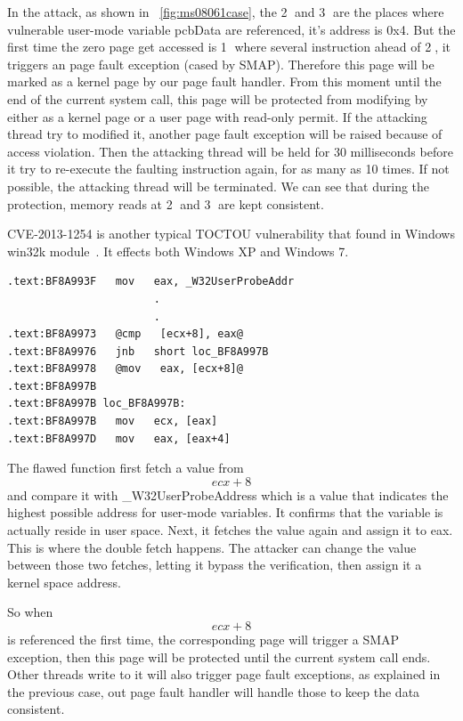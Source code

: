 In the attack, as shown in ~\autoref{fig:ms08061case}, the \textcircled{2} and \textcircled{3} are the places where vulnerable user-mode variable pcbData are referenced, it's address is 0x4. But the first time the zero page get accessed is \textcircled{1} where several instruction ahead of \textcircled{2}, it triggers an page fault exception (cased by SMAP). Therefore this page will be marked as a kernel page by our page fault handler. From this moment until the end of the current system call, this page will be protected from modifying by either as a kernel page or a user page with read-only permit. If the attacking thread try to modified it, another page fault exception  will be raised because of access violation. Then the attacking thread will be held for 30 milliseconds before it try to re-execute the faulting instruction again, for as many as 10 times. If not possible, the attacking thread will be terminated. We can see that during the protection, memory reads at \textcircled{2} and \textcircled{3} are kept consistent.


CVE-2013-1254 is another typical TOCTOU vulnerability that found in Windows win32k module~\cite{jurczyk2013identifying}. It effects both Windows XP and Windows 7. 


\begin{lstlisting}[basicstyle=\small,style=redkeyword] 
.text:BF8A993F   mov   eax, _W32UserProbeAddr
                       .
                       .
.text:BF8A9973   @cmp   [ecx+8], eax@    
.text:BF8A9976   jnb   short loc_BF8A997B
.text:BF8A9978   @mov   eax, [ecx+8]@    
.text:BF8A997B
.text:BF8A997B loc_BF8A997B:                           
.text:BF8A997B   mov   ecx, [eax]
.text:BF8A997D   mov   eax, [eax+4]
\end{lstlisting}

The flawed function first fetch a value from \[ecx+8\] and compare it with \_W32UserProbeAddress which is a value that indicates the highest possible address for user-mode variables. It confirms that the variable is actually reside in user space. Next, it fetches the value again and assign it to eax. This is where the double fetch happens. The attacker can change the value between those two fetches, letting it bypass the verification,  then assign it a kernel space address.

So when \[ecx+8\] is referenced the first time, the corresponding page will trigger a SMAP exception, then this page will be protected until the current system call ends. Other threads write to it will also trigger page fault exceptions, as explained in the previous case, out page fault handler will handle those to keep the data consistent. 


